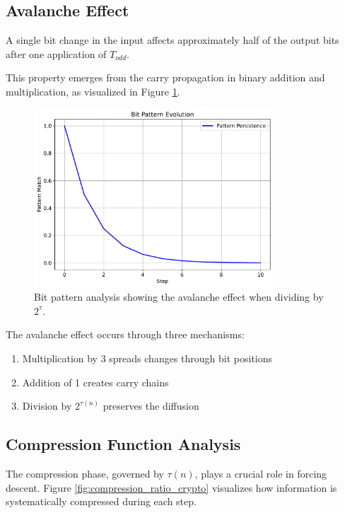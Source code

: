 \subsection{Avalanche Effect}

\begin{theorem}\label{thm:avalanche}
A single bit change in the input affects approximately half of the output bits after one application of $T_{odd}$.
\end{theorem}

This property emerges from the carry propagation in binary addition and multiplication, as visualized in Figure \ref{fig:bit_patterns_crypto}.

\begin{figure}[h]
\centering
\includegraphics[width=0.8\textwidth]{py_visuals/figures/bit_patterns.pdf}
\caption{Bit pattern analysis showing the avalanche effect when dividing by $2^\tau$.}
\label{fig:bit_patterns_crypto}
\end{figure}

The avalanche effect occurs through three mechanisms:
\begin{enumerate}
\item Multiplication by 3 spreads changes through bit positions
\item Addition of 1 creates carry chains
\item Division by $2^{\tau(n)}$ preserves the diffusion
\end{enumerate}

\subsection{Compression Function Analysis}

The compression phase, governed by $\tau(n)$, plays a crucial role in forcing descent. Figure \ref{fig:compression_ratio_crypto} visualizes how information is systematically compressed during each step.

